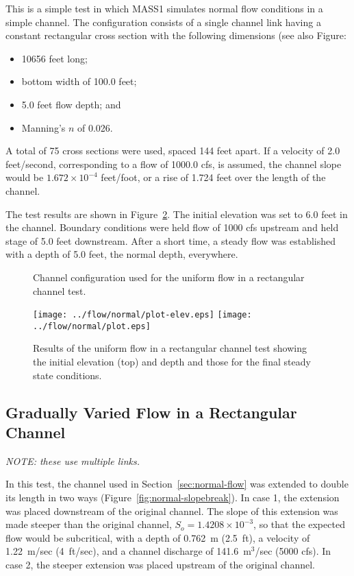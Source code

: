 \documentclass[12pt,dvips,letterpaper]{article}
\begin{document}
This is a simple test in which MASS1 simulates normal flow conditions
in a simple channel.  The configuration consists of a single channel
link having a constant rectangular cross section with the following
dimensions (see also Figure:
\begin{itemize}
\item 10656 feet long;
\item bottom width of 100.0 feet;
\item 5.0 feet flow depth; and
\item Manning's $n$ of 0.026.
\end{itemize}
A total of 75 cross sections were used, spaced 144 feet apart. If a
velocity of 2.0 feet/second, corresponding to a flow of 1000.0 cfs, is
assumed, the channel slope would be $1.672 \times 10^{-4}$ feet/foot,
or a rise of 1.724 feet over the length of the channel.  

The test results are shown in Figure~\ref{fig:normal-flow-results}.
The initial elevation was set to 6.0 feet in the channel.  Boundary
conditions were held flow of 1000 cfs upstream and held stage of 5.0
feet downstream. After a short time, a steady flow was established
with a depth of 5.0 feet, the normal depth, everywhere.  

\begin{figure}[htbp]
  \begin{center}
    
    \caption{Channel configuration used for the uniform flow in a
      rectangular channel test.}
    \label{fig:normal-flow-channel}
  \end{center}
\end{figure}
\begin{figure}[htbp]
  \centering
  \texttt{[image: ../flow/normal/plot-elev.eps]}
  \texttt{[image: ../flow/normal/plot.eps]}
  \caption{Results of the uniform flow in a rectangular channel test
    showing the initial elevation (top) and depth and those for the
    final steady state conditions.}
  \label{fig:normal-flow-results}
\end{figure}

\subsection{Gradually Varied Flow in a Rectangular Channel}
\label{sec:subcr-norm-flow}

\emph{NOTE: these use multiple links.}

In this test, the channel used in Section~\ref{sec:normal-flow} was
extended to double its length in two ways
(Figure~\ref{fig:normal-slopebreak}).  In case 1, the extension was
placed downstream of the original channel.  The slope of this
extension was made steeper than the original channel, $S_{o} = 1.4208
\times 10^{-3}$, so that the expected flow would be subcritical, with a
depth of 0.762~m (2.5~ft), a velocity of 1.22~m/sec (4~ft/sec), and
a channel discharge of 141.6~m$^{3}$/sec (5000 cfs).  In case 2, the
steeper extension was placed upstream of the original channel.
\end{document}
